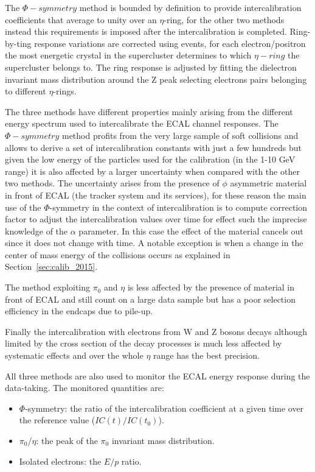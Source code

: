 The $\Phi-symmetry$ method is bounded by definition to provide intercalibration coefficients that average to unity
over an $\eta$-ring, for the other two methods instead this requirements is imposed after the intercalibration is completed.
Ring-by-ting response variations are corrected using \Zee events, for each electron/positron the most energetic crystal in the
supercluster determines to which $\eta-ring$ the supercluster belongs to. The ring response is adjusted by fitting the dielectron
invariant mass distribution around the Z peak selecting electrons pairs belonging to different $\eta$-rings.

The three methods have different properties mainly arising from the different energy spectrum used to intercalibrate the ECAL
channel responses.
The $\Phi-symmetry$ method profits from the very large sample of soft collisions and allows to derive a set of intercalibration
constants with just a few hundreds \pbinv but given the low energy of the particles used for the calibration (in the 1-10 GeV range)
it is also affected by a larger uncertainty when compared with the other two methods.
The uncertainty arises from the presence of $\phi$ asymmetric material in front of ECAL
(the tracker system and its services), for these reason the main use of
the $\Phi$-symmetry in the context of intercalibration is to compute correction factor to adjust the intercalibration values
over time for effect such the imprecise knowledge of the $\alpha$ parameter. In this case the effect of the material cancels
out since it does not change with time. A notable exception is when a change in the center of mass energy of the collisions
occurs as explained in Section~\ref{sec:calib_2015}.

The method exploiting $\pi_0$ and $\eta$ is less affected by the presence of material in front of ECAL and
still count on a large data sample but has a poor selection efficiency in the endcaps due to pile-up.

Finally the intercalibration with electrons from W and Z bosons decays although limited by the cross section
of the decay processes is much less affected by systematic effects and over the whole $\eta $ range has the best
precision.

All three methods are also used to monitor the ECAL energy response during the data-taking. The monitored quantities are:
\begin{itemize}
\item $\Phi$-symmetry: the ratio of the intercalibration coefficient at a given time over the reference value ($IC(t)/IC(t_0)$).
\item $\pi_0$/$\eta$: the peak of the $\pi_0$ invariant mass distribution.
\item Isolated electrons: the $E/p$ ratio.
\end{itemize}

